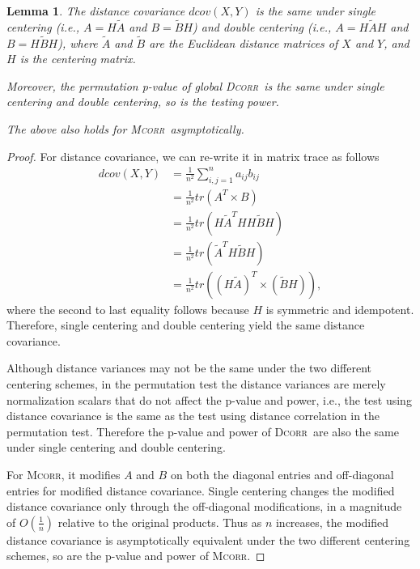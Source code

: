 \documentclass[11pt]{article}
\providecommand{\sct}[1]{{\normalfont\textsc{#1}}}
\newcommand{\Dcorr}{\sct{Dcorr}}
\newcommand{\Mcorr}{\sct{Mcorr}}
\newtheorem{appLem}{Lemma}
\begin{document}
\begin{appLem}
\label{lem1}
The distance covariance $dcov(X,Y)$ is the same under single centering (i.e., $A=H\tilde{A}$ and $B=\tilde{B}H$) and double centering (i.e., $A=H\tilde{A}H$ and $B=H\tilde{B}H$), where $\tilde{A}$ and $\tilde{B}$ are the Euclidean distance matrices of $X$ and $Y$, and $H$ is the centering matrix. 

Moreover, the permutation p-value of global \Dcorr~is the same under single centering and double centering, so is the testing power.

The above also holds for \Mcorr~asymptotically.
\end{appLem}
\begin{proof}
For distance covariance, we can re-write it in matrix trace as follows
\begin{align*}
dcov(X,Y) &= \frac{1}{n^2}\sum_{i,j=1}^{n}a_{ij}b_{ij} \\
 &=\frac{1}{n^2} tr(A^{T} \times B) \\
 &=\frac{1}{n^2} tr(H\tilde{A}^{T}HH\tilde{B}H) \\
 &=\frac{1}{n^2} tr(\tilde{A}^{T}H\tilde{B}H) \\
 &=\frac{1}{n^2} tr((H\tilde{A})^{T} \times (\tilde{B}H)),
\end{align*}
where the second to last equality follows because $H$ is symmetric and idempotent. Therefore, single centering and double centering yield the same distance covariance.

Although distance variances may not be the same under the two different centering schemes, in the permutation test the distance variances are merely normalization scalars that do not affect the p-value and power, i.e., the test using distance covariance is the same as the test using distance correlation in the permutation test. Therefore the p-value and power of \Dcorr~are also the same under single centering and double centering.

For \Mcorr, it modifies $A$ and $B$ on both the diagonal entries and off-diagonal entries for modified distance covariance. Single centering changes the modified distance covariance only through the off-diagonal modifications, in a magnitude of $O(\frac{1}{n})$ relative to the original products. Thus as $n$ increases, the modified distance covariance is asymptotically equivalent under the two different centering schemes, so are the p-value and power of \Mcorr.
\end{proof}
\end{document}

